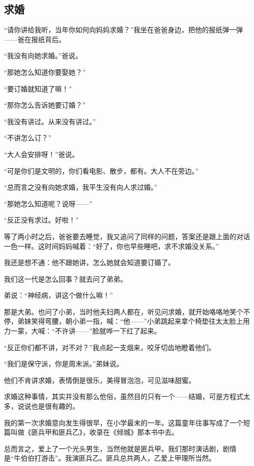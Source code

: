 \subsection{求婚}

\par “请你讲给我听，当年你如何向妈妈求婚？”我坐在爸爸身边，把他的报纸弹一弹——爸在报纸背后。
\par “我没有向她求婚。”爸说。
\par “那她怎么知道你要娶她？”
\par “要订婚就知道了嘛！”
\par “那你怎么告诉她要订婚？”
\par “我没有讲过。从来没有讲过。”
\par “不讲怎么订？”
\par “大人会安排呀！”爸说。
\par “可是你们是文明的，你们看电影、散步，都有。大人不在旁边。”
\par “总而言之没有向她求婚，我平生没有向人求过婚。”
\par “那她怎么知道呢？说呀——”
\par “反正没有求过。好啦！”
\par 等了两小时之后，爸爸要去睡觉，我又追问了同样的问题，答案还是跟上面的对话一色一样。这时间妈妈喊着：“好了，你也早些睡吧，求不求婚没关系。”
\par 我还是想不通：他不跟她讲，怎么她就会知道要订婚了。
\par 我们这一代是怎么回事？就去问了弟弟。
\par 弟说：“神经病，讲这个做什么嘛！”
\par 那是大弟。也问了小弟，当时他夫妇两人都在，听见问求婚，就开始咯咯地笑个不停，弟妹笑得弯腰，朝小弟一指，喊：“他——”小弟跳起来拿个椅垫往太太脸上用力一蒙，大喊：“不许讲——”脸就哗一下红了起来。
\par “反正你们都不讲，对不对？”我点起一支烟来，咬牙切齿地瞪着他们。
\par “我们是保守派，你是周末派。”弟妹说。
\par 他们不肯讲求婚，表情倒是很乐，美得冒泡泡，可见滋味甜蜜。
\par 求婚这种事情，其实并没有那么伧俗，虽然目的只有一个——结婚，可是方程式太多，说说也是很有趣的。
\par 我的第一次求婚意向发生得很早，在小学最末的一年。这篇童年往事写成了一个短篇叫做《匪兵甲和匪兵乙》，收录在《倾城》那本书中去。
\par 总而言之，爱上了一个光头男生，当然他就是匪兵甲。我们那时演话剧，剧情是“牛伯伯打游击”。我演匪兵乙。匪兵总共两人，乙爱上甲理所当然。
